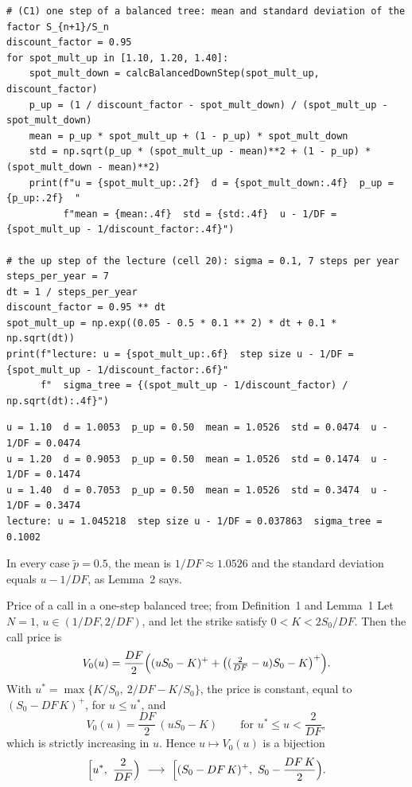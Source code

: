 \documentclass[11pt,a4paper]{article}
\newcommand{\subhead}[1]{\par\medskip\noindent{\large\bfseries #1}\par\smallskip\noindent\ignorespaces}
\begin{document}
\par\smallskip\noindent\begin{minipage}{\linewidth}\begin{lstlisting}[style=py,title={check of (C1)}]
# (C1) one step of a balanced tree: mean and standard deviation of the factor S_{n+1}/S_n
discount_factor = 0.95
for spot_mult_up in [1.10, 1.20, 1.40]:
    spot_mult_down = calcBalancedDownStep(spot_mult_up, discount_factor)
    p_up = (1 / discount_factor - spot_mult_down) / (spot_mult_up - spot_mult_down)
    mean = p_up * spot_mult_up + (1 - p_up) * spot_mult_down
    std = np.sqrt(p_up * (spot_mult_up - mean)**2 + (1 - p_up) * (spot_mult_down - mean)**2)
    print(f"u = {spot_mult_up:.2f}  d = {spot_mult_down:.4f}  p_up = {p_up:.2f}  "
          f"mean = {mean:.4f}  std = {std:.4f}  u - 1/DF = {spot_mult_up - 1/discount_factor:.4f}")

# the up step of the lecture (cell 20): sigma = 0.1, 7 steps per year
steps_per_year = 7
dt = 1 / steps_per_year
discount_factor = 0.95 ** dt
spot_mult_up = np.exp((0.05 - 0.5 * 0.1 ** 2) * dt + 0.1 * np.sqrt(dt))
print(f"lecture: u = {spot_mult_up:.6f}  step size u - 1/DF = {spot_mult_up - 1/discount_factor:.6f}"
      f"  sigma_tree = {(spot_mult_up - 1/discount_factor) / np.sqrt(dt):.4f}")
\end{lstlisting}
\begin{lstlisting}[style=out,title={output}]
u = 1.10  d = 1.0053  p_up = 0.50  mean = 1.0526  std = 0.0474  u - 1/DF = 0.0474
u = 1.20  d = 0.9053  p_up = 0.50  mean = 1.0526  std = 0.1474  u - 1/DF = 0.1474
u = 1.40  d = 0.7053  p_up = 0.50  mean = 1.0526  std = 0.3474  u - 1/DF = 0.3474
lecture: u = 1.045218  step size u - 1/DF = 0.037863  sigma_tree = 0.1002
\end{lstlisting}\end{minipage}\par\smallskip
In every case $\tilde p=0.5$, the mean is $1/DF\approx1.0526$ and the standard deviation equals $u-1/DF$, as Lemma~2 says.

\subhead{(C2) and (C3) for a one-step tree.}

\begin{lembox}{Price of a call in a one-step balanced tree; from Definition~1 and Lemma~1}
Let $N=1$, $u\in(1/DF,2/DF)$, and let the strike satisfy $0<K<2S_0/DF$. Then the call price is
\begin{equation}\label{eq:one}
V_0(u)=\frac{DF}{2}\Bigl((uS_0-K)^+ +\bigl((\tfrac2{DF}-u)S_0-K\bigr)^+\Bigr).
\end{equation}
With $u^*=\max\{K/S_0,\ 2/DF-K/S_0\}$, the price is constant, equal to $(S_0-DF\,K)^+$, for $u\le u^*$, and
\[
V_0(u)=\frac{DF}{2}\,(uS_0-K)\qquad\text{for } u^*\le u<\frac2{DF},
\]
which is strictly increasing in $u$. Hence $u\mapsto V_0(u)$ is a bijection
\begin{equation}\label{eq:range}
\Bigl[u^*,\ \frac2{DF}\Bigr)\ \longrightarrow\ \Bigl[(S_0-DF\,K)^+,\ S_0-\frac{DF\,K}{2}\Bigr).
\end{equation}
\end{lembox}
\end{document}
